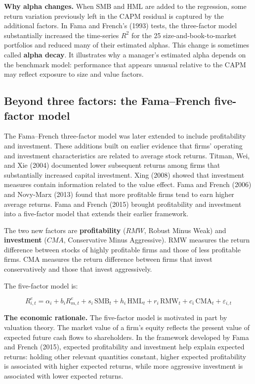 \textbf{Why alpha changes.} When SMB and HML are added to the regression, some return variation previously left in the CAPM residual is captured by the additional factors. In Fama and French's (1993) tests, the three-factor model substantially increased the time-series $R^2$ for the 25 size-and-book-to-market portfolios and reduced many of their estimated alphas. This change is sometimes called \textbf{alpha decay}. It illustrates why a manager's estimated alpha depends on the benchmark model: performance that appears unusual relative to the CAPM may reflect exposure to size and value factors.


\subsection{Beyond three factors: the Fama--French five-factor model}
\label{sec:03-multifactor}

The Fama--French three-factor model was later extended to include profitability and investment. These additions built on earlier evidence that firms' operating and investment characteristics are related to average stock returns. Titman, Wei, and Xie (2004) documented lower subsequent returns among firms that substantially increased capital investment. Xing (2008) showed that investment measures contain information related to the value effect. Fama and French (2006) and Novy-Marx (2013) found that more profitable firms tend to earn higher average returns. Fama and French (2015) brought profitability and investment into a five-factor model that extends their earlier framework.

The two new factors are \textbf{profitability}  ($RMW$, Robust Minus Weak) and
\textbf{investment} ($CMA$, Conservative Minus Aggressive). RMW measures the return difference between stocks of
highly profitable firms and those of less profitable firms. CMA measures the return difference between firms that invest conservatively
and those that invest aggressively. 

The five-factor model is:

\begin{equation}
  R^{e}_{i,t} = \alpha_i + b_i R^{e}_{m,t} + s_i \,\mathrm{SMB}_t + h_i \,\mathrm{HML}_t + r_i \,\mathrm{RMW}_t + c_i \,\mathrm{CMA}_t + \varepsilon_{i,t}
  \label{eq:03-ff5}
\end{equation}

\textbf{The economic rationale.} The five-factor model is motivated in part by valuation theory. The market value of a firm's equity reflects the present value of expected future cash flows to shareholders. In the framework developed by Fama and French (2015), expected profitability and investment help explain expected returns: holding other relevant quantities constant, higher expected profitability is associated with higher expected returns, while more aggressive investment is associated with lower expected returns.

